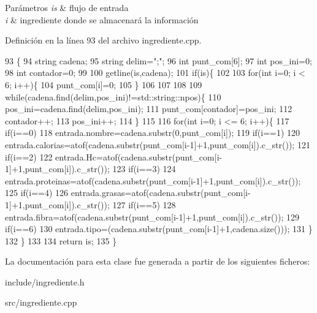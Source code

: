 \begin{DoxyParams}{Parámetros}
{\em is} & flujo de entrada \\
\hline
{\em i} & ingrediente donde se almacenará la información \\
\hline
\end{DoxyParams}


Definición en la línea 93 del archivo ingrediente.\+cpp.


\begin{DoxyCode}
93                                                               \{
94     \textcolor{keywordtype}{string} cadena;
95     \textcolor{keywordtype}{string} delim=\textcolor{stringliteral}{";"};
96     \textcolor{keywordtype}{int} punt\_com[6];
97     \textcolor{keywordtype}{int} pos\_ini=0;
98     \textcolor{keywordtype}{int} contador=0;
99     
100     getline(is,cadena);
101     \textcolor{keywordflow}{if}(is)\{
102     
103         \textcolor{keywordflow}{for}(\textcolor{keywordtype}{int} i=0; i < 6; i++)\{
104             punt\_com[i]=0;
105         \}
106     
107     
108     
109         \textcolor{keywordflow}{while}(cadena.find(delim,pos\_ini)!=std::string::npos)\{
110             pos\_ini=cadena.find(delim,pos\_ini);
111             punt\_com[contador]=pos\_ini;
112             contador++;
113             pos\_ini++;
114         \}
115     
116         \textcolor{keywordflow}{for}(\textcolor{keywordtype}{int} i=0; i <= 6; i++)\{
117             \textcolor{keywordflow}{if}(i==0)
118                 entrada.nombre=cadena.substr(0,punt\_com[i]);
119             \textcolor{keywordflow}{if}(i==1)
120                 entrada.calorias=atof(cadena.substr(punt\_com[i-1]+1,punt\_com[i]).c\_str());
121             \textcolor{keywordflow}{if}(i==2)
122                 entrada.Hc=atof(cadena.substr(punt\_com[i-1]+1,punt\_com[i]).c\_str());
123             \textcolor{keywordflow}{if}(i==3)
124                 entrada.proteinas=atof(cadena.substr(punt\_com[i-1]+1,punt\_com[i]).c\_str());
125             \textcolor{keywordflow}{if}(i==4)
126                 entrada.grasas=atof(cadena.substr(punt\_com[i-1]+1,punt\_com[i]).c\_str());
127             \textcolor{keywordflow}{if}(i==5)
128                 entrada.fibra=atof(cadena.substr(punt\_com[i-1]+1,punt\_com[i]).c\_str());
129             \textcolor{keywordflow}{if}(i==6)
130                 entrada.tipo=(cadena.substr(punt\_com[i-1]+1,cadena.size())); 
131         \}
132     \}
133     
134     \textcolor{keywordflow}{return} is;    
135 \}
\end{DoxyCode}


La documentación para esta clase fue generada a partir de los siguientes ficheros\+:\begin{DoxyCompactItemize}
\item 
include/ingrediente.\+h\item 
src/ingrediente.\+cpp\end{DoxyCompactItemize}
